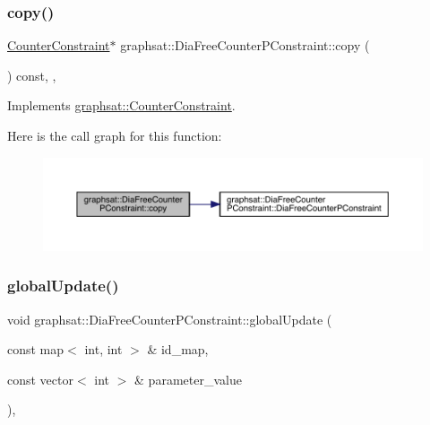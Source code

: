 \subsubsection{\texorpdfstring{copy()}{copy()}}
{\footnotesize\ttfamily \mbox{\hyperlink{classgraphsat_1_1_counter_constraint}{Counter\+Constraint}}$\ast$ graphsat\+::\+Dia\+Free\+Counter\+P\+Constraint\+::copy (\begin{DoxyParamCaption}{ }\end{DoxyParamCaption}) const\hspace{0.3cm}{\ttfamily [inline]}, {\ttfamily [private]}, {\ttfamily [virtual]}}



Implements \mbox{\hyperlink{classgraphsat_1_1_counter_constraint_a880eb6520fcf80de35071d62cb31a640}{graphsat\+::\+Counter\+Constraint}}.

Here is the call graph for this function\+:
\nopagebreak
\begin{figure}[H]
\begin{center}
\leavevmode
\includegraphics[width=350pt]{classgraphsat_1_1_dia_free_counter_p_constraint_a75e3eccebbe42daf47b10209f6ab0b59_cgraph}
\end{center}
\end{figure}
\mbox{\label{classgraphsat_1_1_dia_free_counter_p_constraint_a4a0fe8c88aba82f93aa6b78b0af68cc1}} 
\subsubsection{\texorpdfstring{globalUpdate()}{globalUpdate()}}
{\footnotesize\ttfamily void graphsat\+::\+Dia\+Free\+Counter\+P\+Constraint\+::global\+Update (\begin{DoxyParamCaption}\item[{const map$<$ int, int $>$ \&}]{id\+\_\+map,  }\item[{const vector$<$ int $>$ \&}]{parameter\+\_\+value }\end{DoxyParamCaption})\hspace{0.3cm}{\ttfamily [inline]}, {\ttfamily [virtual]}}

